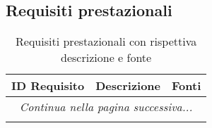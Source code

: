 \resetCR
\subsection{Requisiti prestazionali}
\begin{center}
    \begin{longtable}{|p{3cm}|p{9.85cm}|p{2cm}|}
        \hline
        \rowcolor{lighter-grayer}
        \textbf{ID Requisito} & \textbf{Descrizione} & \textbf{Fonti} \\
        \hline
        \endhead
        \hline
        \multicolumn{3}{|c|}{\textit{Continua nella pagina successiva...}} \\
        \hline
        \endfoot
        \endlastfoot




        \rowcolor{white}
        \caption{Requisiti prestazionali con rispettiva descrizione e fonte}
    \end{longtable}
\end{center}
